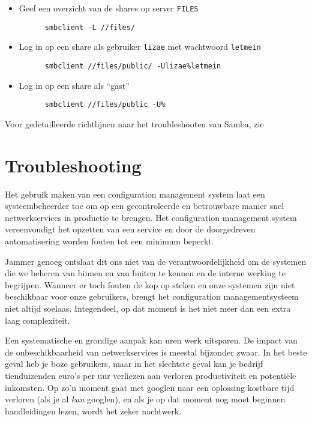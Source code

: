 \begin{itemize}
  \item Geef een overzicht van de shares op server \texttt{FILES}
    \begin{verbatim}
      smbclient -L //files/
    \end{verbatim}
  \item Log in op een share als gebruiker \texttt{lizae} met wachtwoord \texttt{letmein}
    \begin{verbatim}
      smbclient //files/public/ -Ulizae%letmein
    \end{verbatim}
  \item Log in op een share als ``gast''
    \begin{verbatim}
      smbclient //files/public -U%
    \end{verbatim}
\end{itemize}

Voor gedetailleerde richtlijnen naar het troubleshooten van Samba, zie~\textcite{TrigdellEtAl2010,CarterEtAl2010}

\section{Troubleshooting}%
\label{sec:troubleshooting-1}

Het gebruik maken van een configuration management system laat een systeembeheerder toe om op een gecontroleerde en betrouwbare manier snel netwerkservices in productie te brengen. Het configuration management system vereenvoudigt het opzetten van een service en door de doorgedreven automatisering worden fouten tot een minimum beperkt.

Jammer genoeg ontslaat dit ons niet van de verantwoordelijkheid om de systemen die we beheren van binnen en van buiten te kennen en de interne werking te begrijpen. Wanneer er toch fouten de kop op steken en onze systemen zijn niet beschikbaar voor onze gebruikers, brengt het configuration managementsysteem niet altijd soelaas. Integendeel, op dat moment is het niet meer dan een extra laag complexiteit.

Een systematische en grondige aanpak kan uren werk uitsparen. De impact van de onbeschikbaarheid van netwerkservices is meestal bijzonder zwaar. In het beste geval heb je boze gebruikers, maar in het slechtste geval kan je bedrijf tienduizenden euro's per uur verliezen aan verloren productiviteit en potentiële inkomsten. Op zo'n moment gaat met googlen naar een oplossing kostbare tijd verloren (als je al \emph{kan} googlen), en als je op dat moment nog moet beginnen handleidingen lezen, wordt het zeker nachtwerk.


